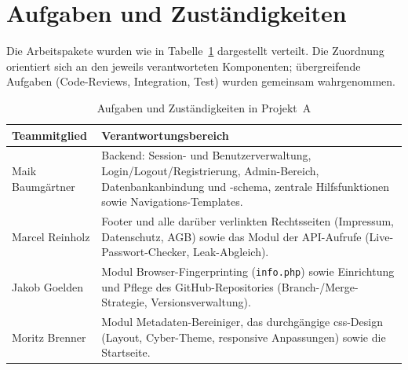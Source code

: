 \section{Aufgaben und Zust\"andigkeiten}
Die Arbeitspakete wurden wie in Tabelle~\ref{tab:a-zustaendig} dargestellt verteilt. Die
Zuordnung orientiert sich an den jeweils verantworteten Komponenten; \"ubergreifende Aufgaben
(Code-Reviews, Integration, Test) wurden gemeinsam wahrgenommen.

\begin{table}[htbp]
\centering
\caption{Aufgaben und Zust\"andigkeiten in Projekt~A}
\label{tab:a-zustaendig}
\begin{tabularx}{\textwidth}{@{}lX@{}}
\toprule
\textbf{Teammitglied} & \textbf{Verantwortungsbereich} \\
\midrule
Maik Baumg\"artner & Backend: Session- und Benutzerverwaltung, Login/Logout/Registrierung,
  Admin-Bereich, Datenbankanbindung und -schema, zentrale Hilfsfunktionen sowie
  Navigations-Templates. \\
\addlinespace
Marcel Reinholz & Footer und alle dar\"uber verlinkten Rechtsseiten (Impressum, Datenschutz,
  AGB) sowie das Modul der API-Aufrufe (Live-Passwort-Checker, Leak-Abgleich). \\
\addlinespace
Jakob Goelden & Modul Browser-Fingerprinting (\texttt{info.php}) sowie Einrichtung und
  Pflege des GitHub-Repositories (Branch-/Merge-Strategie, Versionsverwaltung). \\
\addlinespace
Moritz Brenner & Modul Metadaten-Bereiniger, das durchg\"angige \ac{css}-Design
  (Layout, Cyber-Theme, responsive Anpassungen) sowie die Startseite. \\
\bottomrule
\end{tabularx}
\end{table}

